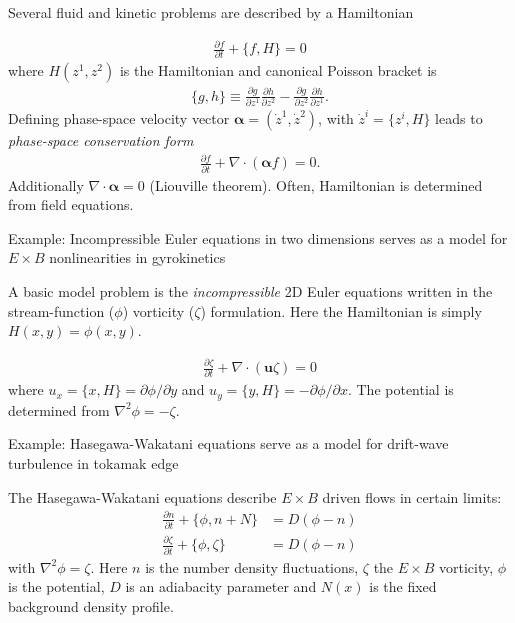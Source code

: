 \documentclass[pdf]{beamer}
\newcommand{\pfrac}[2]{\frac{\partial #1}{\partial #2}}
\newcommand{\mvec}[1]{\mathbf{#1}}
\newcommand{\gvec}[1]{\boldsymbol{#1}}
\theoremstyle{definition}
\begin{document}
\begin{frame}{Several fluid and kinetic problems are described by a
    Hamiltonian}%

  \begin{align*}
    \pfrac{f}{t} + \{f,H\} = 0
  \end{align*}
  where $H(z^1,z^2)$ is the Hamiltonian and canonical Poisson bracket
  is
  \begin{align*}
    \{g,h\} \equiv \pfrac{g}{z^1}\pfrac{h}{z^2} -
    \pfrac{g}{z^2}\pfrac{h}{z^1}.
  \end{align*}
  Defining phase-space velocity vector $\gvec{\alpha} = (\dot{z}^1,
  \dot{z}^2)$, with $\dot{z}^i = \{z^i,H\}$ leads to \emph{phase-space
    conservation form}
  \begin{align*}
    \pfrac{f}{t} + \nabla\cdot\left(\gvec{\alpha}f\right) = 0.
  \end{align*}
  Additionally $\nabla\cdot\gvec{\alpha} = 0$ (Liouville
  theorem). Often, Hamiltonian is determined from field equations.
\end{frame}

\begin{frame}{Example: Incompressible Euler equations in two
    dimensions serves as a model for $E\times B$ nonlinearities in
    gyrokinetics}%

  A basic model problem is the \emph{incompressible} 2D Euler
  equations written in the stream-function ($\phi$) vorticity
  ($\zeta$) formulation. Here the Hamiltonian is simply $H(x,y) =
  \phi(x,y)$.

  \begin{align*}
    \pfrac{\zeta}{t} + \nabla\cdot(\mvec{u}\zeta) = 0
  \end{align*}
  where $u_x = \{x,H\} = \partial\phi/\partial y$ and $u_y = \{y,H\} =
  -\partial\phi/\partial x$. The potential is determined from
  $\nabla^2 \phi = -\zeta$.
\end{frame}

\begin{frame}{Example: Hasegawa-Wakatani equations serve as a model
    for drift-wave turbulence in tokamak edge}%

  The Hasegawa-Wakatani equations describe $E\times B$ driven flows in
  certain limits:
  \begin{align*}
    \pfrac{n}{t} + \{\phi,n+N\} &= D(\phi-n) \\
    \pfrac{\zeta}{t} + \{\phi,\zeta\} &= D(\phi-n)
  \end{align*}
  with $\nabla^2 \phi = \zeta.$ Here $n$ is the number density
  fluctuations, $\zeta$ the $E\times B$ vorticity, $\phi$ is the
  potential, $D$ is an adiabacity parameter and $N(x)$ is the fixed
  background density profile.

\end{frame}
\end{document}

